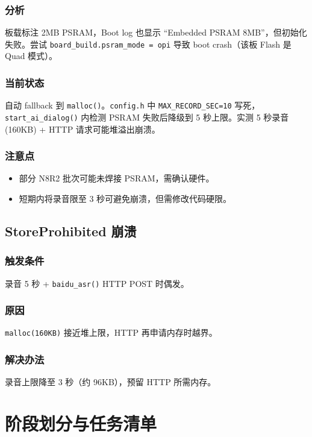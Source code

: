 \documentclass[12pt,a4paper,openany]{ctexbook}
\begin{document}
\subsection*{分析}
板载标注 2MB PSRAM，Boot log 也显示 ``Embedded PSRAM 8MB''，但初始化失败。尝试 \texttt{board\_build.psram\_mode = opi} 导致 boot crash（该板 Flash 是 Quad 模式）。

\subsection*{当前状态}
自动 fallback 到 \texttt{malloc()}。\texttt{config.h} 中 \texttt{MAX\_RECORD\_SEC=10} 写死，\texttt{start\_ai\_dialog()} 内检测 PSRAM 失败后降级到 5 秒上限。实测 5 秒录音(160KB) + HTTP 请求可能堆溢出崩溃。

\subsection*{注意点}
\begin{itemize}
    \item 部分 N8R2 批次可能未焊接 PSRAM，需确认硬件。
    \item 短期内将录音限至 3 秒可避免崩溃，但需修改代码硬限。
\end{itemize}

\section{StoreProhibited 崩溃}

\subsection*{触发条件}
录音 5 秒 + \texttt{baidu\_asr()} HTTP POST 时偶发。

\subsection*{原因}
\texttt{malloc(160KB)} 接近堆上限，HTTP 再申请内存时越界。

\subsection*{解决办法}
录音上限降至 3 秒（约 96KB），预留 HTTP 所需内存。

\chapter{阶段划分与任务清单}
\end{document}

